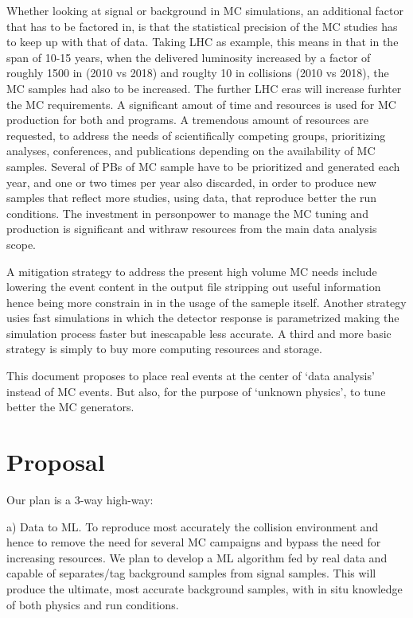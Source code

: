 Whether looking at signal or background in MC simulations, an additional factor that has to be factored in, is that the statistical precision of the MC studies has to keep up with that of data. Taking LHC as example, this means in that in the span of 10-15 years, when the delivered luminosity increased by a factor of roughly 1500 in {\pp} (2010 vs 2018) and rouglty 10 in {\PbPb} collisions (2010 vs 2018), the MC samples had also to be increased. The further LHC eras will increase furhter the MC requirements. A significant amout of time and resources is used for MC production for both {\pp} and {\PbPb} programs. A tremendous amount of resources are requested, to address the needs of scientifically competing groups, prioritizing analyses, conferences, and publications depending on the availability of MC samples. Several of PBs of MC sample have to be prioritized and generated each year, and one or two times per year also discarded, in order to produce new samples that reflect more studies, using data, that reproduce better the run conditions. The investment in personpower to manage the MC tuning and production is significant and withraw resources from the main data analysis scope. 

A mitigation strategy to address the present high volume MC needs include lowering the event content in the output file stripping out useful information hence being more constrain in in the usage of the sameple itself. Another strategy usies fast simulations in which the detector response is parametrized making the simulation process faster but inescapable less accurate. A third and more basic strategy is simply to buy more computing resources and storage. 

This document proposes to place real events at the center of `data analysis' instead of MC events. But also, for the purpose of `unknown physics', to tune better the MC generators.

\section{Proposal}
Our plan is a 3-way high-way: 

a) Data to ML. To reproduce most accurately the collision environment and hence to remove the need for several MC campaigns and bypass the need for increasing resources. We plan to develop a ML algorithm fed by real data and capable of separates/tag  background samples from signal samples. This will produce the ultimate, most accurate background samples, with in situ knowledge of both physics and run conditions. 

